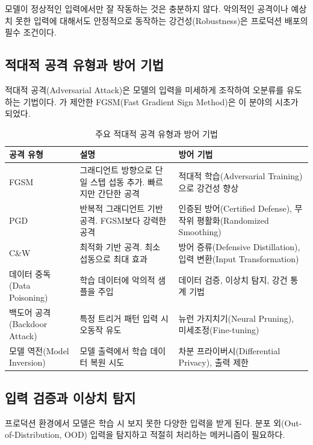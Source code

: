 모델이 정상적인 입력에서만 잘 작동하는 것은 충분하지 않다. 악의적인 공격이나 예상치 못한 입력에 대해서도 안정적으로 동작하는 강건성(Robustness)은 프로덕션 배포의 필수 조건이다\cite{goodfellow2014explaining}.

\subsection{적대적 공격 유형과 방어 기법}
\label{sec:10.4.1}

적대적 공격(Adversarial Attack)은 모델의 입력을 미세하게 조작하여 오분류를 유도하는 기법이다. \cite{goodfellow2014explaining}가 제안한 FGSM(Fast Gradient Sign Method)은 이 분야의 시초가 되었다.

\begin{table}[htbp]
\centering
\caption{주요 적대적 공격 유형과 방어 기법}
\label{tab:adversarial_attacks}
\begin{tabularx}{\textwidth}{p{2.5cm}p{3.5cm}X}
\toprule
\textbf{공격 유형} & \textbf{설명} & \textbf{방어 기법} \\
\midrule
FGSM & 그래디언트 방향으로 단일 스텝 섭동 추가. 빠르지만 간단한 공격 & 적대적 학습(Adversarial Training)으로 강건성 향상 \\
\midrule
PGD & 반복적 그래디언트 기반 공격. FGSM보다 강력한 공격 & 인증된 방어(Certified Defense), 무작위 평활화(Randomized Smoothing) \\
\midrule
C\&W & 최적화 기반 공격. 최소 섭동으로 최대 효과 & 방어 증류(Defensive Distillation), 입력 변환(Input Transformation) \\
\midrule
데이터 중독(Data Poisoning) & 학습 데이터에 악의적 샘플을 주입 & 데이터 검증, 이상치 탐지, 강건 통계 기법 \\
\midrule
백도어 공격(Backdoor Attack) & 특정 트리거 패턴 입력 시 오동작 유도 & 뉴런 가지치기(Neural Pruning), 미세조정(Fine-tuning) \\
\midrule
모델 역전(Model Inversion) & 모델 출력에서 학습 데이터 복원 시도 & 차분 프라이버시(Differential Privacy), 출력 제한 \\
\bottomrule
\end{tabularx}
\end{table}

\subsection{입력 검증과 이상치 탐지}
\label{sec:10.4.2}

프로덕션 환경에서 모델은 학습 시 보지 못한 다양한 입력을 받게 된다. 분포 외(Out-of-Distribution, OOD) 입력을 탐지하고 적절히 처리하는 메커니즘이 필요하다.

